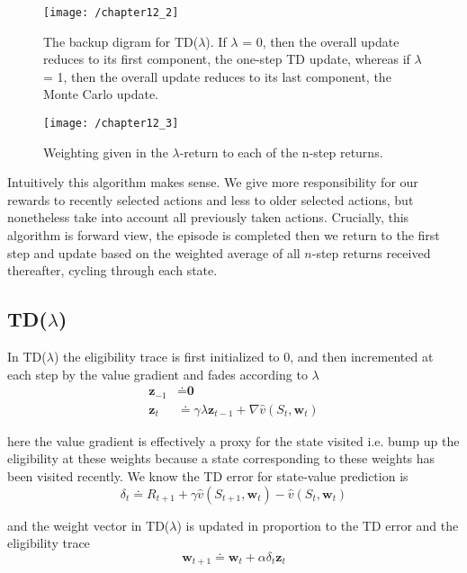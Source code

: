 \begin{figure}
	\centering
	\texttt{[image: /chapter12\_2]}
	\caption{The backup digram for TD($\lambda$). If $\lambda$ = 0, then the overall update reduces to its first component, the one-step TD update, whereas if $\lambda$ = 1, then the overall update reduces to its last component, the Monte Carlo update.}
	\label{fig: 12_2}
\end{figure}

\begin{figure}
	\centering
	\texttt{[image: /chapter12\_3]}
	\caption{Weighting given in the $\lambda$-return to each of the n-step returns.}
	\label{fig: 12_3}
\end{figure}

Intuitively this algorithm makes sense. We give more responsibility for our rewards to recently selected actions and less to older selected actions, but nonetheless take into account all previously taken actions. Crucially, this algorithm is forward view, the episode is completed then we return to the first step and update based on the weighted average of all $n$-step returns received thereafter, cycling through each state.

\subsection{TD($\lambda$)}
In TD($\lambda$) the eligibility trace is first initialized to 0, and then incremented at each step by the value gradient and fades according to $\lambda$
\begin{align} \label{z}
\textbf{z}_{-1} &\doteq \textbf{0} \\
\textbf{z}_t &\doteq \gamma \lambda \textbf{z}_{t-1} + \nabla \hat{v}(S_t, \textbf{w}_t)
\end{align}

here the value gradient is effectively a proxy for the state visited i.e. bump up the eligibility at these weights because a state corresponding to these weights has been visited recently. We know the TD error for state-value prediction is
\begin{equation}
\delta_t \doteq R_{t+1} + \gamma \hat{v}(S_{t+1}, \textbf{w}_t) - \hat{v}(S_t, \textbf{w}_t)
\end{equation}

and the weight vector in TD($\lambda$) is updated in proportion to the TD error and the eligibility trace
\begin{equation}
\textbf{w}_{t+1} \doteq \textbf{w}_t + \alpha \delta_t \textbf{z}_t
\end{equation}

